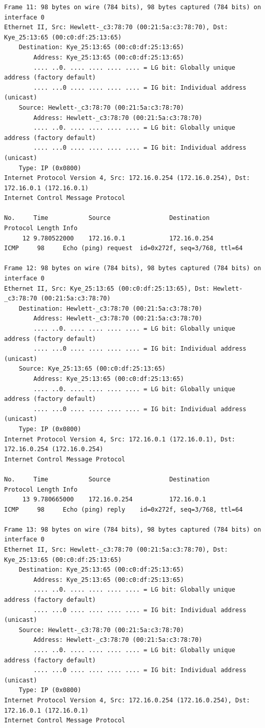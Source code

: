 \documentclass[a4paper,11pt]{article}
\begin{document}
\begin{lstlisting}
Frame 11: 98 bytes on wire (784 bits), 98 bytes captured (784 bits) on interface 0
Ethernet II, Src: Hewlett-_c3:78:70 (00:21:5a:c3:78:70), Dst: Kye_25:13:65 (00:c0:df:25:13:65)
    Destination: Kye_25:13:65 (00:c0:df:25:13:65)
        Address: Kye_25:13:65 (00:c0:df:25:13:65)
        .... ..0. .... .... .... .... = LG bit: Globally unique address (factory default)
        .... ...0 .... .... .... .... = IG bit: Individual address (unicast)
    Source: Hewlett-_c3:78:70 (00:21:5a:c3:78:70)
        Address: Hewlett-_c3:78:70 (00:21:5a:c3:78:70)
        .... ..0. .... .... .... .... = LG bit: Globally unique address (factory default)
        .... ...0 .... .... .... .... = IG bit: Individual address (unicast)
    Type: IP (0x0800)
Internet Protocol Version 4, Src: 172.16.0.254 (172.16.0.254), Dst: 172.16.0.1 (172.16.0.1)
Internet Control Message Protocol

No.     Time           Source                Destination           Protocol Length Info
     12 9.780522000    172.16.0.1            172.16.0.254          ICMP     98     Echo (ping) request  id=0x272f, seq=3/768, ttl=64

Frame 12: 98 bytes on wire (784 bits), 98 bytes captured (784 bits) on interface 0
Ethernet II, Src: Kye_25:13:65 (00:c0:df:25:13:65), Dst: Hewlett-_c3:78:70 (00:21:5a:c3:78:70)
    Destination: Hewlett-_c3:78:70 (00:21:5a:c3:78:70)
        Address: Hewlett-_c3:78:70 (00:21:5a:c3:78:70)
        .... ..0. .... .... .... .... = LG bit: Globally unique address (factory default)
        .... ...0 .... .... .... .... = IG bit: Individual address (unicast)
    Source: Kye_25:13:65 (00:c0:df:25:13:65)
        Address: Kye_25:13:65 (00:c0:df:25:13:65)
        .... ..0. .... .... .... .... = LG bit: Globally unique address (factory default)
        .... ...0 .... .... .... .... = IG bit: Individual address (unicast)
    Type: IP (0x0800)
Internet Protocol Version 4, Src: 172.16.0.1 (172.16.0.1), Dst: 172.16.0.254 (172.16.0.254)
Internet Control Message Protocol

No.     Time           Source                Destination           Protocol Length Info
     13 9.780665000    172.16.0.254          172.16.0.1            ICMP     98     Echo (ping) reply    id=0x272f, seq=3/768, ttl=64

Frame 13: 98 bytes on wire (784 bits), 98 bytes captured (784 bits) on interface 0
Ethernet II, Src: Hewlett-_c3:78:70 (00:21:5a:c3:78:70), Dst: Kye_25:13:65 (00:c0:df:25:13:65)
    Destination: Kye_25:13:65 (00:c0:df:25:13:65)
        Address: Kye_25:13:65 (00:c0:df:25:13:65)
        .... ..0. .... .... .... .... = LG bit: Globally unique address (factory default)
        .... ...0 .... .... .... .... = IG bit: Individual address (unicast)
    Source: Hewlett-_c3:78:70 (00:21:5a:c3:78:70)
        Address: Hewlett-_c3:78:70 (00:21:5a:c3:78:70)
        .... ..0. .... .... .... .... = LG bit: Globally unique address (factory default)
        .... ...0 .... .... .... .... = IG bit: Individual address (unicast)
    Type: IP (0x0800)
Internet Protocol Version 4, Src: 172.16.0.254 (172.16.0.254), Dst: 172.16.0.1 (172.16.0.1)
Internet Control Message Protocol


\end{lstlisting}
\end{document}
